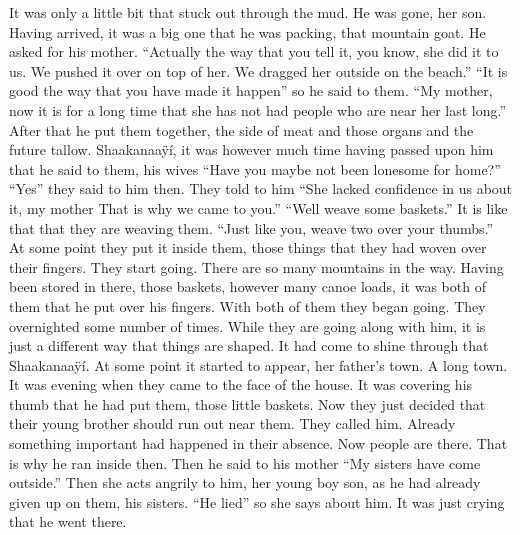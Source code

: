 \begin{pairs}
\begin{Rightside}
It was only a little bit that stuck out through the mud.
\pend
\pstart
{}He was gone, her son.
Having arrived, it was a big one that he was packing, that mountain goat.
He asked for his mother.
\qqk{}“Actually the way that you tell it, you know, she did it to us.
We pushed it over on top of her.
We dragged her outside on the beach.”
\qqk{}“It is good the way that you have made it happen”
so he said to them.
\qqk{}“My mother, now it is for a long time that she has not had people who are near her last long.”
After that he put them together, the side of meat and those organs and the future tallow.
\pend
\pstart
{}Shaakanaaÿí, it was however much time having passed upon him that he said to them, his wives
\qqk{}“Have you maybe not been lonesome for home?”
\qqk{}“Yes” they said to him then.
They told to him
\qqk{}“She lacked confidence in us about it, my mother
That is why we came to you.”
\qqk{}“Well weave some baskets.”
It is like that that they are weaving them.
\qqk{}“Just like you, weave two over your thumbs.”
At some point they put it inside them, those things that they had woven over their fingers.
They start going.
There are so many mountains in the way.
Having been stored in there, those baskets, however many canoe loads,
it was both of them that he put over his fingers.
With both of them they began going.
They overnighted some number of times.
\pend
\pstart
{}While they are going along with him, it is just a different way that things are shaped.
It had come to shine through that Shaakanaaÿí.
At some point it started to appear, her father’s town.
A long town.
It was evening when they came to the face of the house.
It was covering his thumb that he had put them, those little baskets.
Now they just decided that their young brother should run out near them.
They called him.
Already something important had happened in their absence.
Now people are there.
That is why he ran inside then.
Then he said to his mother
\qqk{}“My sisters have come outside.”
Then she acts angrily to him, her young boy son, as he had already given up on them, his sisters.
\qqk{}“He lied”
so she says about him.
It was just crying that he went there.

\end{Rightside}
\end{pairs}
